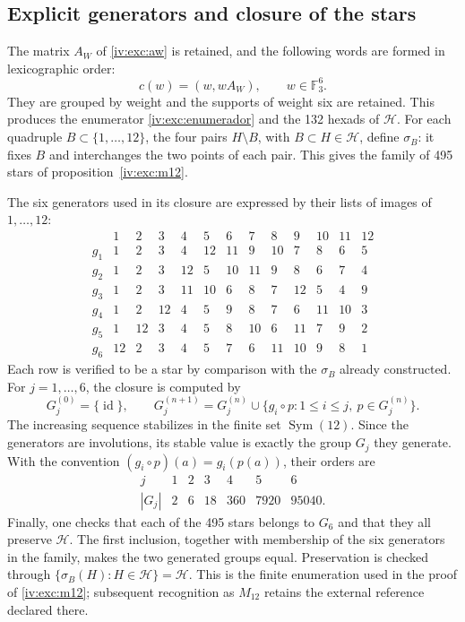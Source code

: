 \subsection{Explicit generators and closure of the stars}
\label{iv:iv:apendice-estrellas}

The matrix \(A_W\) of \eqref{iv:exc:aw} is retained, and the following words
are formed in lexicographic order:
\[
 c(w)=(w,wA_W),\qquad w\in\mathbb F_3^6.
\]
They are grouped by weight and the supports of weight six are retained.
This produces the enumerator \eqref{iv:exc:enumerador} and the 132 hexads
of \(\mathcal H\). For each quadruple \(B\subset\{1,\ldots,12\}\),
the four pairs \(H\setminus B\), with \(B\subset H\in\mathcal H\),
define \(\sigma_B\): it fixes \(B\) and interchanges the two points
of each pair. This gives the family of 495 stars of
proposition~\ref{iv:exc:m12}.

The six generators used in its closure are expressed by their lists
of images of \(1,\ldots,12\):
\[
\begin{array}{c|rrrrrrrrrrrr}
 &1&2&3&4&5&6&7&8&9&10&11&12\\ \hline
g_1&1&2&3&4&12&11&9&10&7&8&6&5\\
g_2&1&2&3&12&5&10&11&9&8&6&7&4\\
g_3&1&2&3&11&10&6&8&7&12&5&4&9\\
g_4&1&2&12&4&5&9&8&7&6&11&10&3\\
g_5&1&12&3&4&5&8&10&6&11&7&9&2\\
g_6&12&2&3&4&5&7&6&11&10&9&8&1
\end{array}
\]
Each row is verified to be a star by comparison with the
\(\sigma_B\) already constructed. For \(j=1,\ldots,6\), the closure
is computed by
\[
 G_j^{(0)}=\{\operatorname{id}\},\qquad
 G_j^{(n+1)}
 =G_j^{(n)}\cup
   \{g_i\circ p:1\leq i\leq j,\ p\in G_j^{(n)}\}.
\]
The increasing sequence stabilizes in the finite set
\(\operatorname{Sym}(12)\). Since the generators are involutions,
its stable value is exactly the group \(G_j\) they generate.
With the convention \((g_i\circ p)(a)=g_i(p(a))\), their orders are
\[
\begin{array}{c|rrrrrr}
 j&1&2&3&4&5&6\\ \hline
 |G_j|&2&6&18&360&7920&95040 .
\end{array}
\]
Finally, one checks that each of the 495 stars belongs
to \(G_6\) and that they all preserve \(\mathcal H\). The first inclusion,
together with membership of the six generators in the family,
makes the two generated groups equal. Preservation is checked
through \(\{\sigma_B(H):H\in\mathcal H\}=\mathcal H\).
This is the finite enumeration used in the proof of
\ref{iv:exc:m12}; subsequent recognition as \(M_{12}\)
retains the external reference declared there.

